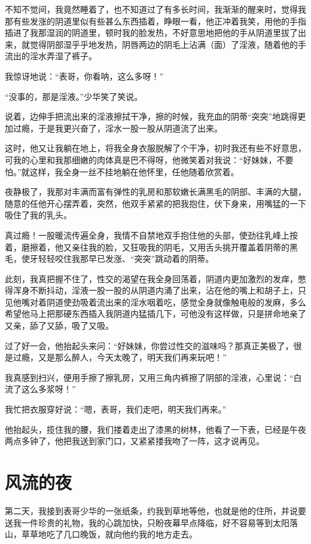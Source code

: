 \documentclass[12pt,UTF8]{ctexbook}
\begin{document}
不知不觉间，我竟然睡着了，也不知道过了有多长时间，我渐渐的醒来时，觉得我那有些发涨的阴道里似有些甚么东西插着，睁眼一看，他正冲着我笑，用他的手指插进了我那湿润的阴道里，顿时我的脸发热，不好意思地把他的手从阴道里拔了出来，就觉得阴部湿乎乎地发热，阴唇两边的阴毛上沾满（面）了淫液，随着他的手流出的淫水弄湿了裤子。

我惊讶地说：“表哥，你看呐，这么多呀！”

“没事的，那是淫液。”少华笑了笑说。

说着，边伸手把流出来的淫液擦拭干净，擦的时候，我充血的阴蒂“突突”地跳得更加过瘾，于是我更兴奋了，淫水一股一股从阴道流了出来。

这时，他又让我躺在地上，将我全身衣服脱解了个干净，初时我还有些不好意思，可我的心里和我那细嫩的肉体真是巴不得呀，他微笑着对我说：“好妹妹，不要怕。”就这样，我全身一丝不挂地躺在他怀里，任他随着欣赏着。

夜静极了，我那对丰满而富有弹性的乳房和那软嫩长满黑毛的阴部、丰满的大腿，随意的任他开心摆弄着，突然，他双手紧紧的把我抱住，伏下身来，用嘴猛的一下吸住了我的乳头。

真过瘾！一股暖流传遍全身，我情不自禁地双手抱住他的头部，使劲往乳峰上按着，磨擦着，他又亲往我的脸，又狂吸我的阴毛，又用舌头挑开覆盖着阴蒂的黑毛，使牙轻轻咬住我那早已发涨、“突突”跳动着的阴蒂。

此刻，我真把握不住了，性交的渴望在我全身回荡着，阴道内更加激烈的发痒，憋得浑身不断抖动，淫液一股一股的从阴道内涌了出来，沾在他的嘴上和胡子上，只见他嘴对着阴道使劲吸着流出来的淫水咽着吃，感觉全身就像触电般的发麻，多么希望他马上把那硬东西插入我阴道内猛插几下，可他没有这样做，只是拼命地亲了又亲，舔了又舔，吸了又吸。

过了好一会，他抬起头来问：“好妹妹，你尝过性交的滋味吗？那真正美极了，很是过瘾，又是那么醉人，今天太晚了，明天我们再来玩吧！”

我真感到扫兴，便用手擦了擦乳房，又用三角内裤擦了阴部的淫液，心里说：“白流了这么多浆呀！”

我忙把衣服穿好说：“嗯，表哥，我们走吧，明天我们再来。”

他抬起头，揽住我的腰，我们搂着走出了漆黑的树林，他看了一下表，已经是午夜两点多钟了，他把我送到家门口，又紧紧搂我吻了一阵，这才说再见。

\chapter{风流的夜}

第二天，我接到表哥少华的一张纸条，约我到草地等他，也就是他的住所，并说要送我一件珍贵的礼物，我的心跳加快，只盼夜幕早点降临，好不容易等到太阳落山，草草地吃了几口晚饭，就向他约我的地方走去。
\end{document}
